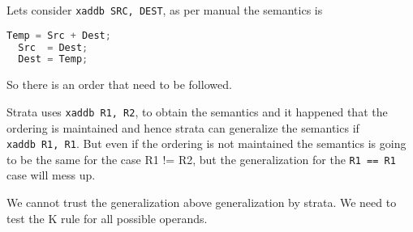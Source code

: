 Lets consider \texttt{xaddb\ SRC,\ DEST}, as per manual the semantics is
\begin{lstlisting}[language=C]
  Temp = Src + Dest;
  Src  = Dest;
  Dest = Temp;
\end{lstlisting}

So there is an order that need to be followed.

Strata uses \texttt{xaddb\ R1,\ R2}, to obtain the semantics and it
happened that the ordering is maintained and hence strata can generalize
the semantics if \texttt{xaddb\ R1,\ R1}. But even if the ordering is
not maintained the semantics is going to be the same for the case R1 !=
R2, but the generalization for the \texttt{R1\ ==\ R1} case will mess
up.

We cannot trust the generalization above generalization by strata. We
need to test the K rule for all possible operands.

